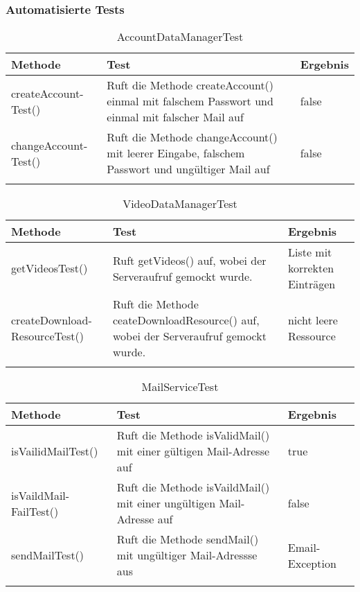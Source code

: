 \subsubsection{Automatisierte Tests}
 \begin{longtable}{p{} | p{} | p{}}
\hline
  \textbf{Methode} & \textbf{Test} & \textbf{Ergebnis}\\
  \hline
  createAccount-\newline
  Test() & Ruft die Methode createAccount() einmal mit falschem Passwort und einmal mit falscher Mail auf& false\\
  \hline
  changeAccount-\newline
  Test() & Ruft die Methode changeAccount() mit leerer Eingabe, falschem Passwort und ungültiger Mail auf & false\\
  \hline
  \caption{AccountDataManagerTest}
 \end{longtable}
 
  \begin{longtable}{p{} | p{} | p{}}
\hline
  \textbf{Methode} & \textbf{Test} & \textbf{Ergebnis}\\
  \hline
  getVideosTest() & Ruft getVideos() auf, wobei der Serveraufruf gemockt wurde. & Liste mit korrekten Einträgen\\
  \hline
  createDownload-\newline
  ResourceTest() & Ruft die Methode ceateDownloadResource() auf, wobei der Serveraufruf gemockt wurde. & nicht leere Ressource\\
  \hline
  \caption{VideoDataManagerTest}
 \end{longtable}
 
   \begin{longtable}{p{} | p{} | p{}}
\hline
  \textbf{Methode} & \textbf{Test} & \textbf{Ergebnis}\\
  \hline
  isVailidMailTest() & Ruft die Methode isValidMail() mit einer gültigen Mail-Adresse auf & true\\
  \hline
  isVaildMail-\newline
  FailTest() & Ruft die Methode isVaildMail() mit einer ungültigen Mail-Adresse auf & false\\
  \hline
  sendMailTest() & Ruft die Methode sendMail() mit ungültiger Mail-Adressse aus & Email-\newline
  Exception\\
  \hline
  \caption{MailServiceTest}
 \end{longtable}
 
